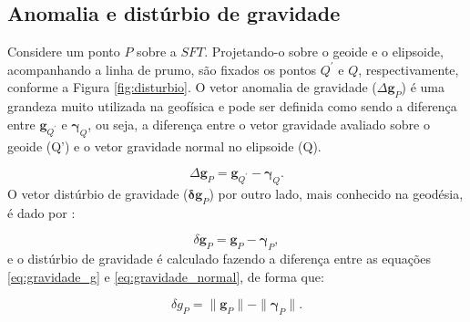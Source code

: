 \subsection{Anomalia e distúrbio de gravidade}

Considere um ponto $P$ sobre a $SFT$. Projetando-o sobre o geoide e o elipsoide, acompanhando a linha de prumo, são fixados os pontos $Q^{\prime}$ e $Q$, respectivamente, conforme a Figura \ref{fig:disturbio}. O vetor anomalia de gravidade ($\Delta \mathbf{g}_P$) é uma grandeza muito utilizada na geofísica e pode ser definida como sendo a diferença entre $\mathbf{g}_{Q^{\prime}}$ e $\mathbf{\gamma}_{Q}$, ou seja, a diferença entre o vetor gravidade avaliado sobre o geoide (Q') e o vetor gravidade normal no elipsoide (Q).

\begin{equation}
\label{eq:vetor_anomalia de gravidade}
\displaystyle {\Delta \mathbf{g}_P = \mathbf{g}_{Q^{\prime}} - \boldsymbol{\gamma}_Q}.
\end{equation} O vetor distúrbio de gravidade ($\mathbf{\delta g}_P$) por outro lado, mais conhecido na geodésia, é dado por \cite{torge,hofmann2006}:

\begin{equation}
\label{eq:vetor_disturbio}
\displaystyle {\delta \mathbf{g}_P = \mathbf{g}_P - \boldsymbol{\gamma}_P},
\end{equation} e o distúrbio de gravidade é calculado fazendo a diferença entre as equações \ref{eq:gravidade_g} e \ref{eq:gravidade_normal}, de forma que:

\begin{equation}
\label{eq:disturbio}
\displaystyle {\delta g_P = \parallel\mathbf{g}_P\parallel - \parallel\boldsymbol{\gamma}_P\parallel}.
\end{equation}

